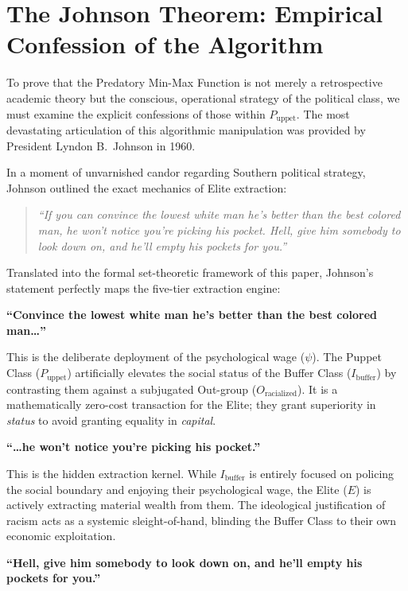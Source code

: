 \documentclass[12pt,openany]{book}
\begin{document}
\section{The Johnson Theorem: Empirical Confession of the Algorithm}

To prove that the Predatory Min-Max Function is not merely a retrospective academic theory but the conscious, operational strategy of the political class, we must examine the explicit confessions of those within $P_{\text{uppet}}$. The most devastating articulation of this algorithmic manipulation was provided by President Lyndon B.\ Johnson in 1960.

In a moment of unvarnished candor regarding Southern political strategy, Johnson outlined the exact mechanics of Elite extraction:

\begin{quote}
\textit{``If you can convince the lowest white man he's better than the best colored man, he won't notice you're picking his pocket. Hell, give him somebody to look down on, and he'll empty his pockets for you.''}
\end{quote}

Translated into the formal set-theoretic framework of this paper, Johnson's statement perfectly maps the five-tier extraction engine:

\medskip
\noindent\textbf{``Convince the lowest white man he's better than the best colored man\ldots''}

\noindent This is the deliberate deployment of the psychological wage ($\psi$). The Puppet Class ($P_{\text{uppet}}$) artificially elevates the social status of the Buffer Class ($I_{\text{buffer}}$) by contrasting them against a subjugated Out-group ($O_{\text{racialized}}$). It is a mathematically zero-cost transaction for the Elite; they grant superiority in \textit{status} to avoid granting equality in \textit{capital}.

\medskip
\noindent\textbf{``\ldots he won't notice you're picking his pocket.''}

\noindent This is the hidden extraction kernel. While $I_{\text{buffer}}$ is entirely focused on policing the social boundary and enjoying their psychological wage, the Elite ($E$) is actively extracting material wealth from them. The ideological justification of racism acts as a systemic sleight-of-hand, blinding the Buffer Class to their own economic exploitation.

\medskip
\noindent\textbf{``Hell, give him somebody to look down on, and he'll empty his pockets for you.''}
\end{document}
